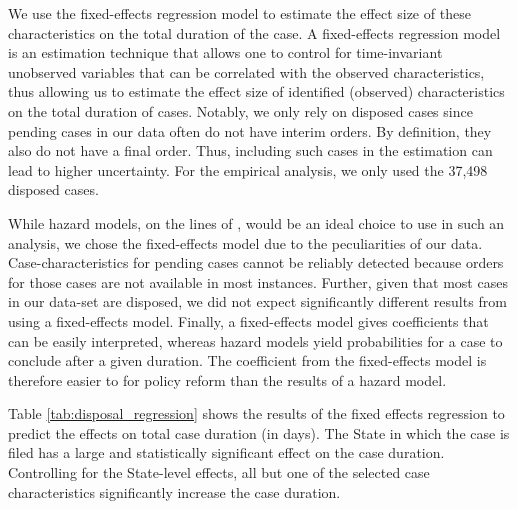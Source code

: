 We use the fixed-effects regression model to estimate the effect size of these characteristics on the total duration of the case. A fixed-effects regression model is an estimation technique that allows one to control for time-invariant unobserved variables that can be correlated with the observed characteristics, thus allowing us to estimate the effect size of identified (observed) characteristics on the total duration of cases. Notably, we only rely on disposed cases since pending cases in our data often do not have interim orders. By definition, they also do not have a final order. Thus, including such cases in the estimation can lead to higher uncertainty. For the empirical analysis, we only used the 37,498 disposed cases. 

While hazard models, on the lines of \textcite{datta2017_itatDelays}, would be an ideal choice to use in such an analysis, we chose the fixed-effects model due to the peculiarities of our data. Case-characteristics for pending cases cannot be reliably detected because orders for those cases are not available in most instances. Further, given that most cases in our data-set are disposed, we did not expect significantly different results from using a fixed-effects model. Finally, a fixed-effects model gives coefficients that can be easily interpreted, whereas hazard models yield probabilities for a case to conclude after a given duration. The coefficient from the fixed-effects model is therefore easier to for policy reform than the results of a hazard model.

Table \ref{tab:disposal_regression} shows the results of the fixed effects regression to predict the effects on total case duration (in days). The State in which the case is filed has a large and statistically significant effect on the case duration. Controlling for the State-level effects, all but one of the selected case characteristics significantly increase the case duration.


